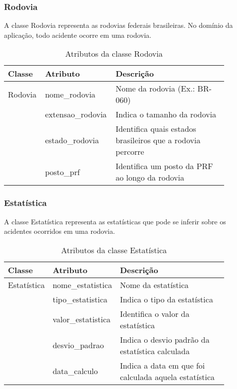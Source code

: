     
\subsubsection*{\textbf{Rodovia}}

  A classe Rodovia representa as rodovias federais brasileiras. No domínio da aplicação, todo acidente ocorre em uma rodovia.
  
    \begin{table*}[!h]
    \centering
    \begin{tabular}{p{0.15\linewidth}p{0.23\linewidth}p{0.5\linewidth}}
      \hline
      \textbf{Classe} & \textbf{Atributo} & \textbf{Descrição}\\
      \hline
	Rodovia & nome\_rodovia & Nome da rodovia (Ex.: BR-060)\\
		& extensao\_rodovia & Indica o tamanho da rodovia\\
		& estado\_rodovia & Identifica quais estados brasileiros que a rodovia percorre\\
		& posto\_prf & Identifica um posto da PRF ao longo da rodovia\\
      \hline
    \end{tabular}
    \caption{Atributos da classe Rodovia}
    \label{tab:attr_rodovia}
    \end{table*}

\subsubsection*{\textbf{Estatística}}

  A classe Estatística representa as estatísticas que pode se inferir sobre os acidentes ocorridos em uma rodovia.
  
    \begin{table*}[!h]
    \centering
    \begin{tabular}{p{0.15\linewidth}p{0.23\linewidth}p{0.5\linewidth}}
      \hline
      \textbf{Classe} & \textbf{Atributo} & \textbf{Descrição}\\
      \hline
	Estatística & nome\_estatistica & Nome da estatística\\
		    & tipo\_estatistica & Indica o tipo da estatística\\
		    & valor\_estatistica & Identifica o valor da estatística\\
		    & desvio\_padrao & Indica o desvio padrão da estatística calculada\\
		    & data\_calculo & Indica a data em que foi calculada aquela estatística\\
      \hline
    \end{tabular}
    \caption{Atributos da classe Estatística}
    \label{tab:attr_estatistica}
    \end{table*}    


